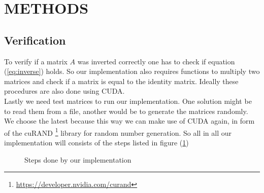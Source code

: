 

\section{METHODS}
\label{sec:methods}
\subsection*{Verification}
To verify if a matrix $A$ was inverted correctly one has to check if equation (\ref{eq:inverse}) holds. So our implementation also requires functions to multiply two matrices and check if a matrix is equal to the identity matrix. Ideally these procedures are also done using CUDA.\\
Lastly we need test matrices to run our implementation. One solution might be to read them from a file, another would be to generate the matrices randomly. We choose the latest because this way we can make use of CUDA again, in form of the cuRAND \footnote{\url{https://developer.nvidia.com/curand}} library for random number generation. So all in all our implementation will consists of the steps listed in figure (\ref{fig:steps})

\begin{figure}
\centering
\label{fig:steps}
\caption{Steps done by our implementation}
\end{figure}



